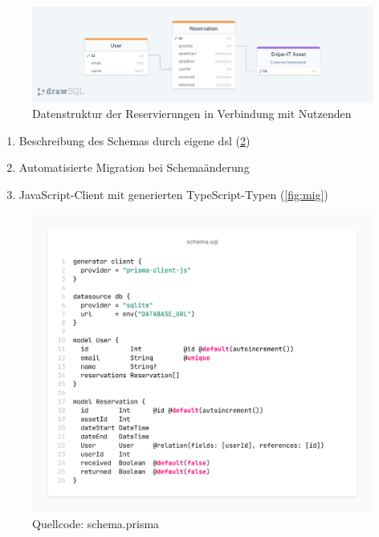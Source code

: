 \begin{figure}[ht]
  \centering
  \includegraphics[scale=0.25]{Bilder/drawSQL-export-2022-10-09_15 56.png}
  \caption[Datenstruktur der Reservierungen in Verbindung mit Nutzenden]{Datenstruktur der Reservierungen in Verbindung mit Nutzenden}
  \label{fig:orm}
\end{figure}


\begin{enumerate}
  \item Beschreibung des Schemas durch eigene \ac{dsl} (\ref{fig:prisma})
  \item Automatisierte Migration bei Schemaänderung
  \item JavaScript-Client mit generierten TypeScript-Typen (\ref{fig:mig})
\end{enumerate}

\begin{figure}[h]
  \centering
  \includegraphics[scale=0.35]{Bilder/screenshot(8).png}
  \caption[Quellcode: schema.prisma]{Quellcode: schema.prisma}
  \label{fig:prisma}
\end{figure}


